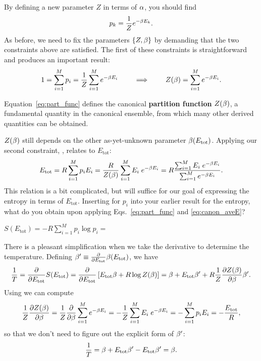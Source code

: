 By defining a new parameter $Z$ in terms of $\alpha$, you should find
\begin{equation}
  \label{eq:occ_prob}
  p_k = \frac{1}{Z} e^{-\beta E_k}.
\end{equation}
As before, we need to fix the parameters $\left\{Z, \beta\right\}$ by demanding that the two constraints above are satisfied.
The first of these constraints is straightforward and produces an important result:
\begin{equation}
  \label{eq:part_func}
  1 = \sum_{i = 1}^M p_i = \frac{1}{Z} \sum_{i = 1}^M e^{-\beta E_i} \qquad \implies \qquad Z(\beta) = \sum_{i = 1}^M e^{-\beta E_i}.
\end{equation}

\begin{shaded}
  Equation~\ref{eq:part_func} defines the canonical \textbf{partition function} $Z(\beta)$, a fundamental quantity in the canonical ensemble, from which many other derived quantities can be obtained.
\end{shaded}

$Z(\beta)$ still depends on the other as-yet-unknown parameter $\beta(E_{\text{tot}})$.
Applying our second constraint, , relates \be to $E_{\text{tot}}$:
\begin{equation} %
  \label{eq:canon_aveE}
  E_{\text{tot}} = R \sum_{i = 1}^M p_i E_i = \frac{R}{Z(\be)} \sum_{i = 1}^M E_i \; e^{-\be E_i} = R \frac{\sum_{i = 1}^M E_i \; e^{-\be E_i}}{\sum_{i = 1}^M e^{-\be E_i}}.
\end{equation}
This relation is a bit complicated, but will suffice for our goal of expressing the entropy in terms of $E_{\text{tot}}$.
Inserting  for $p_i$ into your earlier result for the entropy, what do you obtain upon applying Eqs.~\ref{eq:part_func} and \ref{eq:canon_aveE}?
\begin{mdframed}
  $\displaystyle S(E_{\text{tot}}) = -R \sum_{i = 1}^M p_i \log p_i = $ \\[100 pt]
\end{mdframed}
There is a pleasant simplification when we take the derivative to determine the temperature.
Defining $\beta' \equiv \frac{\partial }{\partial E_{\text{tot}}} \beta(E_{\text{tot}})$, we have
\begin{equation*}
  \frac{1}{T} = \frac{\partial }{\partial E_{\text{tot}}} S(E_{\text{tot}}) = \frac{\partial }{\partial E_{\text{tot}}} \left[E_{\text{tot}} \beta + R\log Z(\beta)\right] = \beta + E_{\text{tot}} \beta' + R \frac{1}{Z} \frac{\partial Z(\beta)}{\partial \beta} \beta' .
\end{equation*}
Using  we can compute
\begin{equation*}
  \frac{1}{Z} \frac{\partial Z(\beta)}{\partial \beta} = \frac{1}{Z} \frac{\partial }{\partial \beta} \sum_{i = 1}^M e^{-\beta E_i} = -\frac{1}{Z} \sum_{i = 1}^M E_i \; e^{-\beta E_i} = -\sum_{i = 1}^M p_i E_i = -\frac{E_{\text{tot}}}{R},
\end{equation*}
so that we don't need to figure out the explicit form of $\beta'$:
\begin{equation}
  \label{eq:beta}
  \frac{1}{T} = \beta + E_{\text{tot}} \beta' - E_{\text{tot}} \beta' = \beta .
\end{equation}

